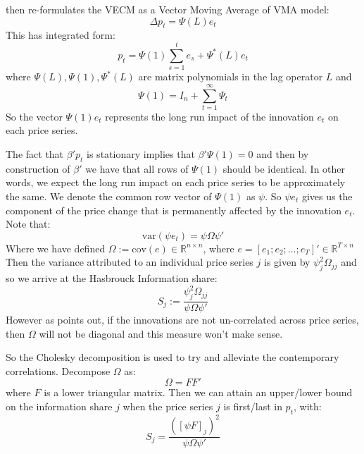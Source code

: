 \cite{HASBROUCK1995} then re-formulates the VECM as a Vector Moving Average of VMA model:
\begin{equation}
    \Delta p_{t} = \Psi(L)e_{t} \label{VMA}
\end{equation}
This has integrated form:
\begin{equation}
    p_{t} = \Psi(1) \sum_{s=1}^t e_{s} + \Psi^*(L)e_{t}
\end{equation}
where $\Psi(L), \Psi(1), \Psi^*(L)$ are matrix polynomials in the lag operator $L$ and
\begin{equation}
    \Psi(1) = I_{n} + \sum_{t=1}^\infty \Psi_{t} \label{Psi1}
\end{equation}
So the vector $\Psi(1)e_{t}$ represents the long run impact of the innovation $e_{t}$ on each price series.

The fact that $\beta' p_{t}$ is stationary implies that $\beta' \Psi(1) = 0$ and then by construction of $\beta'$ we have that all rows of $\Psi(1)$ should be identical. In other words, we expect the long run impact
on each price series to be approximately the same. We denote the common row vector
of $\Psi(1)$ as $\psi$. So $\psi e_{t}$ gives us the component of the price change that is permanently affected by the innovation $e_{t}$. Note that:
\begin{equation}
    \text{var}(\psi e_{t}) = \psi \Omega \psi'
\end{equation}
Where we have defined $\Omega := \text{cov}(e) \in \mathbb{R}^{n \times n}$, where $e = [e_{1}; e_{2}; \dots; e_{T}]' \in \mathbb{R}^{T \times n}$
Then the variance attributed to an individual price series $j$ is given by $\psi_{j}^{2} \Omega_{jj}$ and so we arrive at the Hasbrouck Information share:
\begin{equation}
    S_{j} := \frac{\psi_{j}^{2} \Omega_{jj}}{\psi \Omega \psi'} \label{Hasequation}
\end{equation}
However as \cite{HASBROUCK1995} points out, if the innovations are not un-correlated across price series, then $\Omega$ will not be diagonal and this measure won't make sense.

So the Cholesky decomposition is used to try and alleviate the contemporary correlations.
Decompose $\Omega$ as:
\begin{equation}
    \Omega = F F'
\end{equation}
where $F$ is a lower triangular matrix. Then we can attain an upper/lower bound on the
information share $j$ when the price series $j$ is first/last in $p_{t}$, with:
\begin{equation}
    S_{j} = \frac{([\psi F]_{j})^{2}}{\psi \Omega \psi'}
\end{equation}

